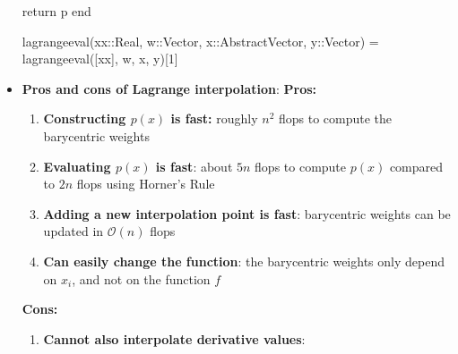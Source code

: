 \documentclass{report}
\begin{document}
\begin{itemize}
\begin{jlcode}
    return p  
end

lagrangeeval(xx::Real, w::Vector, x::AbstractVector, y::Vector) = lagrangeeval([xx], w, x, y)[1]
    \end{jlcode}
\item \textbf{Pros and cons of Lagrange interpolation}:
    \textbf{Pros:}
    \begin{enumerate}
        \item \textbf{Constructing $p(x)$ is fast:} roughly $n^2$ flops to compute the barycentric weights
        \item \textbf{Evaluating $p(x)$ is fast}: about $5n$ flops to compute $p(x)$ compared to $2n$ flops using Horner's Rule
        \item \textbf{Adding a new interpolation point is fast}: barycentric weights can be updated in $\mathcal{O}(n)$ flops
        \item \textbf{Can easily change the function}: the barycentric weights only depend on $x_i$, and not on the function $f$
    \end{enumerate}
    \textbf{Cons:}
    \begin{enumerate}
        \item \textbf{Cannot also interpolate derivative values}:
    \end{enumerate}












    \end{itemize}















    
\end{document}
